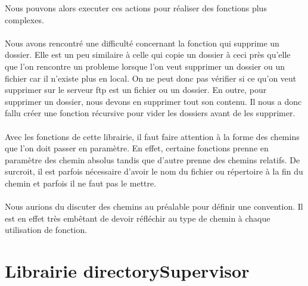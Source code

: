 Nous pouvons alors executer ces actions pour réaliser des fonctions plus complexes.\\
\\
Nous avons rencontré une difficulté concernant la fonction qui supprime un dossier. 
Elle est un peu similaire à celle qui copie un dossier à ceci près qu'elle que l'on rencontre un probleme lorsque l'on
veut supprimer un dossier ou un fichier car il n'existe plus en local. On ne peut donc pas vérifier si ce 
qu'on veut supprimer sur le serveur ftp est un fichier ou un dossier. En outre, pour supprimer un dossier, nous devons en supprimer 
tout son contenu. Il nous a donc fallu créer une fonction récursive pour vider les dossiers avant de les supprimer.\\
\\
Avec les fonctions de cette librairie, il faut faire attention à la forme des chemins que l'on doit passer en paramètre. 
En effet, certaine fonctions prenne en paramètre des chemin absolus tandis que d'autre prenne des chemins relatifs. 
De surcroit, il est parfois nécessaire d'avoir le nom du fichier ou répertoire à la fin du chemin et parfois il ne faut pas le mettre.\\
\\
Nous aurions du discuter des chemins au préalable pour définir une convention. 
Il est en effet très embêtant de devoir réfléchir au type de chemin à chaque utilisation de fonction.


\section{Librairie directorySupervisor}

